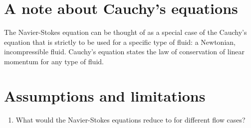 \section{A note about Cauchy's equations}

The Navier-Stokes equation can be thought of as a special case of the Cauchy's equation that is strictly to be used for a specific type of fluid: a Newtonian, incompressible fluid. Cauchy's equation states the law of conservation of linear momentum for any type of fluid. 


\section{Assumptions and limitations}






\begin{enumerate}

\item What would the Navier-Stokes equations reduce to for different flow cases?

\end{enumerate}
